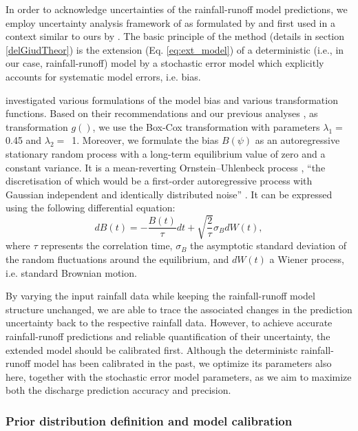 \documentclass{ctuthesis}\usepackage[]{graphicx}\usepackage[]{color}
\begin{document}
In order to acknowledge uncertainties of the rainfall-runoff model predictions, we employ uncertainty analysis framework of \cite{kennedy2001bayesian} as formulated by \cite{reichert2012linking} and first used in a context similar to ours by \cite{giudice2013improving}. The basic principle of the method (details in section \ref{delGiudTheor}) is the extension (Eq. \ref{eq:ext_model}) of a deterministic (i.e., in our case, rainfall-runoff) model by a stochastic error model which explicitly accounts for systematic model errors, i.e. bias. 

\cite{giudice2013improving} investigated various formulations of the model bias and various transformation functions. Based on their recommendations and our previous analyses \citep{pastorekEffectDifferentRainfall2016}, as transformation $g()$, we use the Box-Cox transformation \citep{box1964analysis} with parameters $\lambda_1 =$ 0.45 and $\lambda_2 =$~1. Moreover,   we formulate the bias $B (\psi)$ as an autoregressive stationary random process with a long-term equilibrium value of zero and a constant variance. It is a mean-reverting Ornstein–Uhlenbeck process \citep{uhlenbeck1930theory}, \enquote{the discretisation of which would be a first-order autoregressive process with Gaussian independent and identically distributed noise} \citep{giudice2013improving}. It can be expressed using the following differential equation:
\begin{equation} 
dB (t)= - \frac{B (t)}{\tau}dt + \sqrt{\frac{2}{\tau}} \sigma_{B}  dW(t),
\end{equation}
where $\tau$ represents the correlation time, $\sigma_{B}$ the asymptotic standard deviation of the random fluctuations around the equilibrium, and $dW(t)$ a Wiener process, i.e. standard Brownian motion.


By varying the input rainfall data while keeping the rainfall-runoff model structure unchanged, we are able to trace the associated changes in the prediction uncertainty back to the respective rainfall data. However, to achieve accurate rainfall-runoff predictions and reliable quantification of their uncertainty, the extended model should be calibrated first. Although the deterministc rainfall-runoff model has been calibrated in the past, we optimize its parameters also here, together with the stochastic error model parameters, as we aim to maximize both the discharge prediction accuracy and precision.


\subsubsection{Prior distribution definition and model calibration} \label{priors_calibr}
\end{document}
